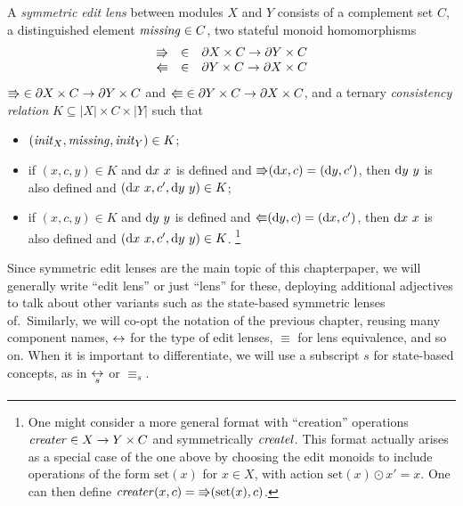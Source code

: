 \begin{defn}\label{defn:lens}
A \emph{symmetric edit lens} between modules $X$ and $Y$ consists of a
complement set $C$, a distinguished element $\mathit{missing}\in C$, 
two stateful monoid homomorphisms 
\iffull
\[
\begin{array}{lcl}
\mathord{\Rrightarrow} &\in& \partial X \times C \to \partial Y \times C \\
\mathord{\Lleftarrow} &\in& \partial Y \times C \to \partial X \times C
\end{array}
\]
\else
$\mathord{\Rrightarrow} \in \partial X \times C \to \partial Y \times C$ and
$\mathord{\Lleftarrow} \in \partial Y \times C \to \partial X \times C$, 
\fi
%
and a ternary {\em consistency relation}
$K\subseteq |X|\times C\times |Y|$ such that
\begin{itemize}
\item $(\mathit{init}_X,\mathit{missing},\mathit{init}_Y)\in K$;
\item if $(x,c,y)\in K$ and $\textrm{d} x\ x$ is defined and $\mathord{\Rrightarrow}(\textrm{d} x,c)=(\textrm{d} y,c')$, then $\textrm{d} y\ y$ is also defined and $(\textrm{d} x\ x,c',\textrm{d} y\ y)\in K$;
\item if $(x,c,y)\in K$ and $\textrm{d} y\ y$ is defined and $\mathord{\Lleftarrow}(\textrm{d} y,c)=(\textrm{d} x,c')$, then $\textrm{d} x\ x$ is also defined and $(\textrm{d} x\ x,c',\textrm{d} y\ y)\in K$.%
%
\iffull
\footnote{One might consider a more general format with ``creation''
  operations $\mathit{creater}\in X\rightarrow Y\times C$ and symmetrically
  $\mathit{createl}$.  This format actually arises as a special case of the one
  above by choosing the edit monoids to include operations of the form
  $\text{set}(x)$ for $x\in X$, with action $\text{set}(x)\odot x'=x$. One
  can then define $\mathit{creater}(x,c) = \mathord{\Rrightarrow}(\text{set}(x),c)$.}
\fi
%
\end{itemize}
\end{defn}
Since symmetric edit lenses are the main topic of this \ifdissertation
chapter\else paper\fi, we will
generally write ``edit lens'' or just ``lens'' for these,
deploying additional adjectives to talk about other variants such
as \iflater{} \fi the state-based
symmetric lenses of\symmlenses.\ifdissertation\ Similarly, we will co-opt
the notation of the previous chapter, reusing many component names, $\leftrightarrow$
for the type of edit lenses, $\equiv$ for lens equivalence, and so on. When
it is important to differentiate, we will use a subscript $s$ for
state-based concepts, as in $\sslens$ or $\equiv_s$.\fi

